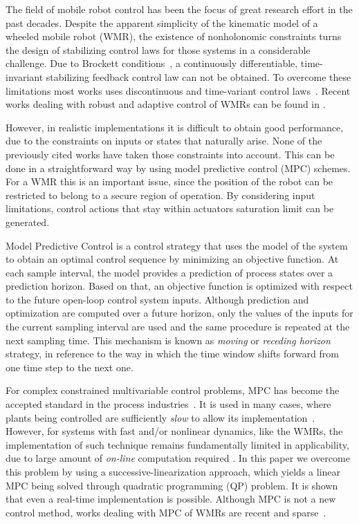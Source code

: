 \documentclass[conference]{IEEEtran} %
\begin{document}
The field of mobile robot control has been the focus of great research
effort in the past decades. Despite the apparent simplicity of the kinematic
model of a wheeled mobile robot (WMR), the existence of nonholonomic
constraints turns the design of stabilizing control laws for those systems
in a considerable challenge. Due to Brockett conditions~\cite{brockett82}, a
continuously differentiable, time-invariant stabilizing feedback control law
can not be obtained. To overcome these limitations most works uses
discontinuous and time-variant control
laws~\cite{bloch89,samson91,canudas92,yamamoto94,murray97}. Recent works
dealing with robust and adaptive control of WMRs can be found in
\cite{oya03,dixon04}.

However, in realistic implementations it is difficult to obtain good
performance, due to the constraints on inputs or states that naturally
arise. None of the previously cited works have taken those constraints
into account. This can be done in a straightforward way by using model
predictive control (MPC) schemes. For a WMR this is an important issue,
since the position of the robot can be restricted to belong to a secure
region of operation. By considering input limitations, control actions that
stay within actuators saturation limit can be generated.

Model Predictive Control is a control strategy that uses the model of the
system to obtain an optimal control sequence by minimizing an objective
function. At each sample interval, the model provides a prediction of
process states over a prediction horizon. Based on that, an objective
function is optimized with respect to the future open-loop control system
inputs. Although prediction and optimization are computed over a future
horizon, only the values of the inputs for the current sampling interval are
used and the same procedure is repeated at the next sampling time. This
mechanism is known as {\it moving} or {\it receding horizon} strategy, in
reference to the way in which the time window shifts forward from one time
step to the next one.

For complex constrained multivariable control problems, MPC has become the
accepted standard in the process industries~\cite{bemporad02}. It is used in
many cases, where plants being controlled are sufficiently {\em slow} to
allow its implementation~\cite{mayne98}. However, for systems with fast
and/or nonlinear dynamics, like the WMRs, the implementation of such
technique remains fundamentally limited in applicability, due to large
amount of {\em on-line} computation required \cite{cannon00}. In this paper
we overcome this problem by using a successive-linearization approach, which
yields a linear MPC being solved through quadratic programming (QP)
problem. It is shown that even a real-time implementation is possible.
Although MPC is not a new control method, works dealing with MPC of WMRs are
recent and sparse~\cite{ollero91,rico99,essen01}.
\end{document}

